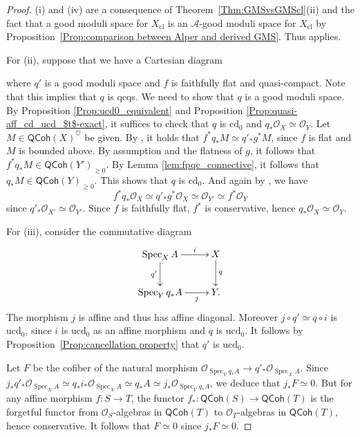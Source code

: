 \documentclass[a4paper,twoside,11pt]{amsart}
\theoremstyle{plain}
\theoremstyle{definition}
\theoremstyle{remark}
\numberwithin{equation}{section}
\newcommand{\cd}{\mathrm{cd}}
\newcommand\sA{\mathcal{A}}
\newcommand{\ucd}{$\mathrm{ucd}_{0}$\xspace}
\renewcommand{\cd}{$\mathrm{cd}_{0}$\xspace}
\DeclareMathOperator{\Spec}{Spec} %
\newcommand{\QCoh}{\mathsf{QCoh}}
\newcommand{\cl}{\mathrm{cl}} %
\newcommand{\oO}{\mathcal{O}}
\begin{document}
\begin{proof}
    (i) and (iv) are a consequence of Theorem~\ref{Thm:GMSvsGMScl}(ii) and the fact that a good moduli space for $X_\cl$ is an $\sA$-good moduli space for $X_\cl$ by Proposition~\ref{Prop:comparison between Alper and derived GMS}. Thus \cite[Theorem~4.16]{AlperGood} applies.
    
    For (ii), suppose that we have a Cartesian diagram
    \begin{center}
    \end{center}
    where $q'$ is a good moduli space and $f$ is faithfully flat and quasi-compact. Note that this implies that $q$ is qcqs. We need to show that $q$ is a good moduli space. By Proposition \ref{Prop:ucd0_equivalent} and Proposition \ref{Prop:quasi-aff_cd_ucd_$t$-exact}, it suffices to check that $q$ is \cd and $q_\ast \oO_X \simeq \oO_Y$. Let $M \in \QCoh(X)^{\heartsuit}$ be given. By \cite[Lem.~A.1.3]{HalpernleistnerMapping}, it holds that $f^*q_*M \simeq q'_*g^*M$, since $f$ is flat and $M$ is bounded above. By assumption and the flatness of $g$, it follows that $f^*q_*M \in \QCoh(Y')_{\geq 0}$. By Lemma \ref{lem:fpqc_connective}, it follows that $q_*M \in \QCoh(Y)_{\geq 0}$. This shows that $q$ is \cd. And again by \cite[Lem.~A.1.3]{HalpernleistnerMapping}, we have
    \[ f^*q_*\oO_X \simeq q'_*g^*\oO_X \simeq \oO_{Y'} \simeq f^\ast \oO_Y \]
    since $q'_* \oO_{X'} \simeq \oO_{Y'}$. Since $f$ is faithfully flat, $f^*$ is conservative, hence $q_*\oO_X \simeq \oO_Y$.

    For (iii), consider the commutative diagram
    \begin{align*}
        \xymatrix{
        \Spec_X A \ar[r]^-{i} \ar[d]_-{q'} & X \ar[d]^-{q} \\
        \Spec_Y q_\ast A \ar[r]_-j & Y.
        }
    \end{align*}
    The morphism $j$ is affine and thus has affine diagonal. Moreover $j \circ q' \simeq q \circ i$ is \ucd, since $i$ is \ucd as an affine morphism and $q$ is \ucd. It follows by Proposition~\ref{Prop:cancellation property} that $q'$ is \ucd. 
    
    Let $F$ be the cofiber of the natural morphism $\oO_{\Spec_Y q_\ast A} \to q'_\ast \oO_{\Spec_X A}$. Since $j_\ast q'_\ast \oO_{\Spec_X A} \simeq q_\ast i_\ast \oO_{\Spec_X A} \simeq q_\ast A \simeq j_\ast \oO_{\Spec_Y q_\ast A}$, we deduce that $j_\ast F \simeq 0$. But for any affine morphism $f \colon S \to T$, the functor $f_*\colon \QCoh(S)\to \QCoh(T)$ is the forgetful functor from $\oO_S$-algebras in $\QCoh(T)$ to $\oO_T$-algebras in $\QCoh(T)$, hence conservative. It follows that $F \simeq 0$ since $j_*F \simeq 0$.


\end{proof}
\end{document}
